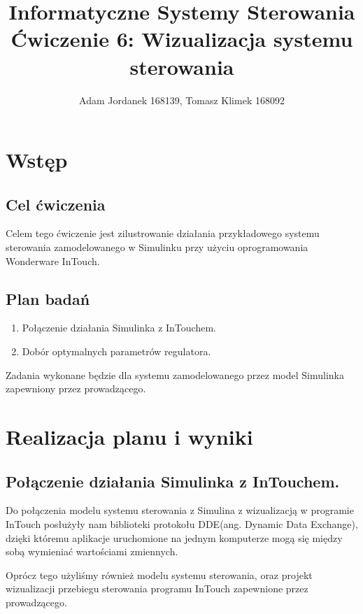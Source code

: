 \documentclass[a4paper,10pt]{article}
\title{Informatyczne Systemy Sterowania \\ \large Ćwiczenie 6: Wizualizacja systemu sterowania}
\author{Adam Jordanek 168139, Tomasz Klimek 168092}
\begin{document}
\maketitle

\section{Wstęp}\label{sec:wstęp}
\subsection{Cel ćwiczenia}
Celem tego ćwiczenie jest zilustrowanie działania przykładowego systemu sterowania zamodelowanego w Simulinku przy użyciu oprogramowania Wonderware InTouch.

\subsection{Plan badań} 
\begin{enumerate}
	\item Połączenie działania Simulinka z InTouchem.
	\item Dobór optymalnych parametrów regulatora.
\end{enumerate}
Zadania wykonane będzie dla systemu zamodelowanego przez model Simulinka zapewniony przez prowadzącego.

\newpage
\section{Realizacja planu i wyniki}

\subsection{Połączenie działania Simulinka z InTouchem.}\label{sec:zad1}
Do połączenia modelu systemu sterowania z Simulina z wizualizacją w programie InTouch posłużyły nam biblioteki protokołu DDE(ang. Dynamic Data Exchange), dzięki któremu aplikacje uruchomione na jednym komputerze mogą się między sobą wymieniać wartościami zmiennych.

Oprócz tego użyliśmy również modelu systemu sterowania, oraz projekt wizualizacji przebiegu sterowania programu InTouch zapewnione przez prowadzącego.
\end{document}

